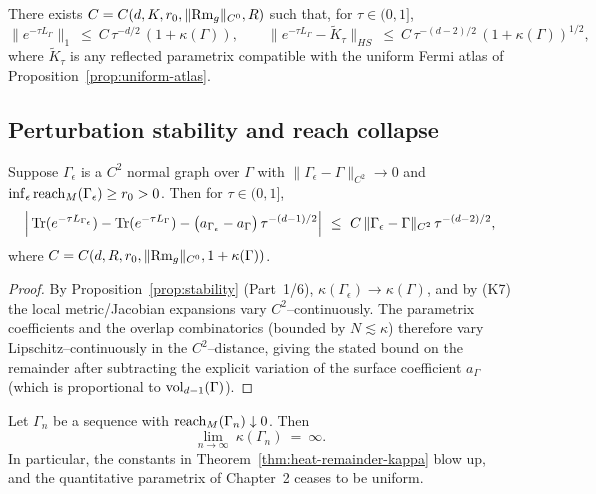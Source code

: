 \begin{corollary}
\label{cor:trace-hs}
There exists $C=C(d,K,r_0,\|{\rm Rm}_g\|_{C^0},R)$ such that, for $\tau\in(0,1]$,
\[
\|e^{-\tau L_\Gamma}\|_{1}\ \le\ C\,\tau^{-d/2}\,(1+\kappa(\Gamma)),\qquad
\|e^{-\tau L_\Gamma}-\tilde K_\tau\|_{HS}\ \le\ C\,\tau^{-(d-2)/2}\,(1+\kappa(\Gamma))^{1/2},
\]
where $\tilde K_\tau$ is any reflected parametrix compatible with the uniform Fermi atlas of Proposition~\ref{prop:uniform-atlas}.
\end{corollary}

\subsection{Perturbation stability and reach collapse}
\label{subsec:stability-reach}

\begin{proposition}
\label{prop:stability-remainder}
Suppose $\Gamma_\epsilon$ is a $C^2$ normal graph over $\Gamma$ with $\|\Gamma_\epsilon-\Gamma\|_{C^2}\to 0$ and $\inf_\epsilon \operatorname{reach}_M(\Gamma_\epsilon)\ge r_0>0$. Then for $\tau\in(0,1]$,
\[
\Big|\operatorname{Tr}(e^{-\tau L_{\Gamma_\epsilon}})-\operatorname{Tr}(e^{-\tau L_\Gamma}) -\big(a_{\Gamma_\epsilon}-a_\Gamma\big)\,\tau^{-(d-1)/2}\Big|
\ \le\ C\,\|\Gamma_\epsilon-\Gamma\|_{C^2}\,\tau^{-(d-2)/2},
\]
where $C=C(d,R,r_0,\|{\rm Rm}_g\|_{C^0},1+\kappa(\Gamma))$.
\end{proposition}

\begin{proof}
By Proposition~\ref{prop:stability} (Part~1/6), $\kappa(\Gamma_\epsilon)\to \kappa(\Gamma)$, and by (K7) the local metric/Jacobian expansions vary $C^2$–continuously. The parametrix coefficients and the overlap combinatorics (bounded by $N\lesssim \kappa$) therefore vary Lipschitz–continuously in the $C^2$–distance, giving the stated bound on the remainder after subtracting the explicit variation of the surface coefficient $a_\Gamma$ (which is proportional to $\operatorname{vol}_{d-1}(\Gamma)$).
\end{proof}

\begin{proposition}
\label{prop:reach-collapse}
Let $\Gamma_n$ be a sequence with $\operatorname{reach}_M(\Gamma_n)\downarrow 0$. Then
\[
\lim_{n\to\infty}\ \kappa(\Gamma_n)\ =\ \infty.
\]
In particular, the constants in Theorem~\ref{thm:heat-remainder-kappa} blow up, and the quantitative parametrix of Chapter~2 ceases to be uniform.
\end{proposition}

